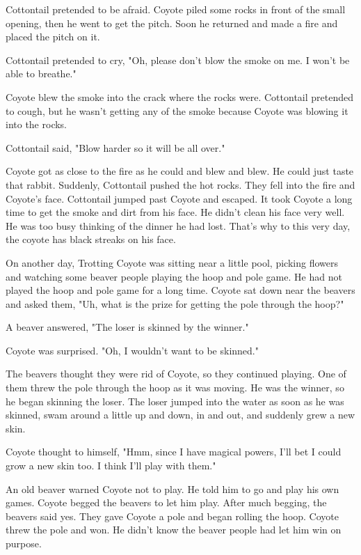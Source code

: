 Cottontail pretended to be afraid. Coyote piled some rocks in front of the small opening, then he went to get the pitch. Soon he returned and made a fire and placed the pitch on it.

Cottontail pretended to cry, "Oh, please don't blow the smoke on me. I won't be able to breathe."

Coyote blew the smoke into the crack where the rocks were. Cottontail pretended to cough, but he wasn't getting any of the smoke because Coyote was blowing it into the rocks.

Cottontail said, "Blow harder so it will be all over."

Coyote got as close to the fire as he could and blew and blew. He could just taste that rabbit. Suddenly, Cottontail pushed the hot rocks. They fell into the fire and Coyote's face. Cottontail jumped past Coyote and escaped. It took Coyote a long time to get the smoke and dirt from his face. He didn't clean his face very well. He was too busy thinking of the dinner he had lost. That's why to this very day, the coyote has black streaks on his face.

On another day, Trotting Coyote was sitting near a little pool, picking flowers and watching some beaver people playing the hoop and pole game. He had not played the hoop and pole game for a long time. Coyote sat down near the beavers and asked them, "Uh, what is the prize for getting the pole through the hoop?"

A beaver answered, "The loser is skinned by the winner."

Coyote was surprised. "Oh, I wouldn't want to be skinned."

The beavers thought they were rid of Coyote, so they continued playing. One of them threw the pole through the hoop as it was moving. He was the winner, so he began skinning the loser. The loser jumped into the water as soon as he was skinned, swam around a little up and down, in and out, and suddenly grew a new skin.

Coyote thought to himself, "Hmm, since I have magical powers, I'll bet I could grow a new skin too. I think I'll play with them."

An old beaver warned Coyote not to play. He told him to go and play his own games. Coyote begged the beavers to let him play. After much begging, the beavers said yes. They gave Coyote a pole and began rolling the hoop. Coyote threw the pole and won. He didn't know the beaver people had let him win on purpose.

